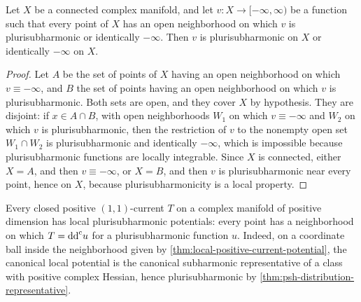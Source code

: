 \begin{lemma}\label{lem:psh-local-alternative}
Let $X$ be a connected complex manifold, and let $v\colon X\to[-\infty,\infty)$ be a function such that every point of $X$ has an open neighborhood on which $v$ is plurisubharmonic or identically $-\infty$. Then $v$ is plurisubharmonic on $X$ or identically $-\infty$ on $X$.
\end{lemma}
\begin{proof}
Let $A$ be the set of points of $X$ having an open neighborhood on which $v\equiv-\infty$, and $B$ the set of points having an open neighborhood on which $v$ is plurisubharmonic. Both sets are open, and they cover $X$ by hypothesis. They are disjoint: if $x\in A\cap B$, with open neighborhoods $W_1$ on which $v\equiv-\infty$ and $W_2$ on which $v$ is plurisubharmonic, then the restriction of $v$ to the nonempty open set $W_1\cap W_2$ is plurisubharmonic and identically $-\infty$, which is impossible because plurisubharmonic functions are locally integrable. Since $X$ is connected, either $X=A$, and then $v\equiv-\infty$, or $X=B$, and then $v$ is plurisubharmonic near every point, hence on $X$, because plurisubharmonicity is a local property.
\end{proof}

Every closed positive $(1,1)$-current $T$ on a complex manifold of positive dimension has local plurisubharmonic potentials: every point has a neighborhood on which $T=\mathrm{dd}^{\mathrm{c}} u$ for a plurisubharmonic function $u$. Indeed, on a coordinate ball inside the neighborhood given by \cref{thm:local-positive-current-potential}, the canonical local potential is the canonical subharmonic representative of a class with positive complex Hessian, hence plurisubharmonic by \cref{thm:psh-distribution-representative}.

